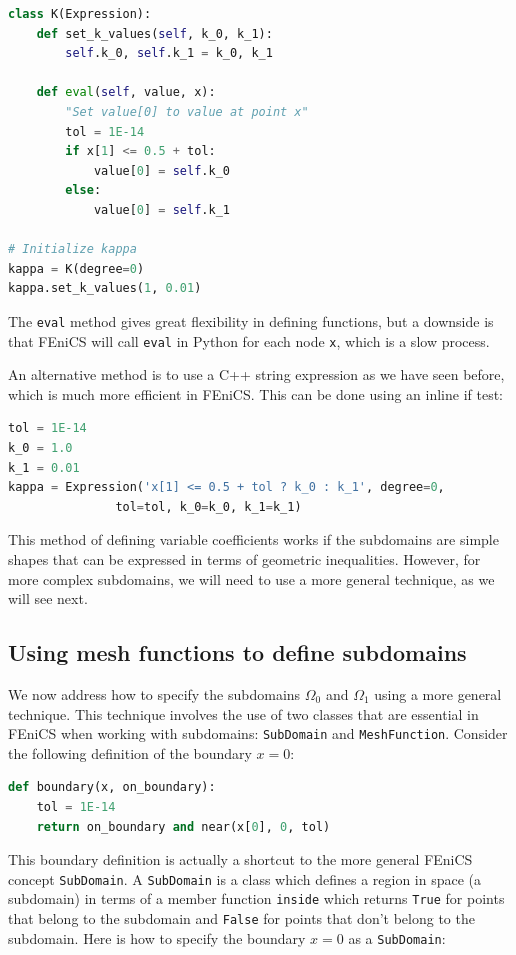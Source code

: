 \documentclass[graybox,envcountchap,sectrefs,final]{svmonodo}
\begin{document}
\begin{lstlisting}[language=Python,style=graycolor]
class K(Expression):
    def set_k_values(self, k_0, k_1):
        self.k_0, self.k_1 = k_0, k_1

    def eval(self, value, x):
        "Set value[0] to value at point x"
        tol = 1E-14
        if x[1] <= 0.5 + tol:
            value[0] = self.k_0
        else:
            value[0] = self.k_1

# Initialize kappa
kappa = K(degree=0)
kappa.set_k_values(1, 0.01)
\end{lstlisting}
The \texttt{eval} method gives great flexibility in defining functions, but a
downside is that FEniCS will call \texttt{eval} in Python for each node \texttt{x},
which is a slow process.

An alternative method is to use a C++ string expression as we have
seen before, which is much more efficient in FEniCS. This can be done
using an inline if test:

\begin{lstlisting}[language=Python,style=graycolor]
tol = 1E-14
k_0 = 1.0
k_1 = 0.01
kappa = Expression('x[1] <= 0.5 + tol ? k_0 : k_1', degree=0,
               tol=tol, k_0=k_0, k_1=k_1)
\end{lstlisting}

This method of defining variable coefficients works if the subdomains
are simple shapes that can be expressed in terms of geometric
inequalities. However, for more complex subdomains, we will need to
use a more general technique, as we will see next.


\subsection{Using mesh functions to define subdomains}


We now address how to specify the subdomains $\Omega_0$ and $\Omega_1$
using a more general technique. This technique involves the use of two
classes that are essential in FEniCS when working with subdomains:
\texttt{SubDomain} and \texttt{MeshFunction}. Consider the following definition of the
boundary $x = 0$:

\begin{lstlisting}[language=Python,style=graycolor]
def boundary(x, on_boundary):
    tol = 1E-14
    return on_boundary and near(x[0], 0, tol)
\end{lstlisting}
This boundary definition is actually a shortcut to the more general
FEniCS concept \texttt{SubDomain}. A \texttt{SubDomain} is a class which defines a
region in space (a subdomain) in terms of a member function \texttt{inside}
which returns \texttt{True} for points that belong to the subdomain and
\texttt{False} for points that don't belong to the subdomain. Here is how to
specify the boundary $x = 0$ as a \texttt{SubDomain}:
\end{document}
